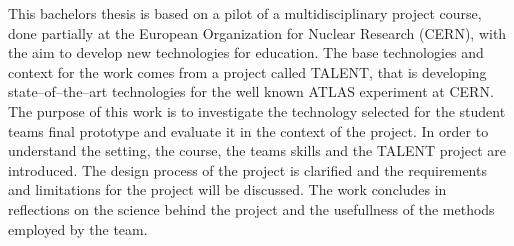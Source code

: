 \documentclass[english,12pt,a4paper,pdftex]{article}
\begin{document}

\makecoverpage

\begin{abstractpage}[english]

This bachelors thesis is based on a pilot of a multidisciplinary project course, done partially at the European Organization for Nuclear Research (CERN), with the aim to develop new technologies for education. The base technologies and context for the work comes from a project called TALENT, that is developing state--of--the--art technologies for the well known ATLAS experiment at CERN. The purpose of this work is to investigate the technology selected for the student teams final prototype and evaluate it in the context of the project. In order to understand the setting, the course, the teams skills and the TALENT project are introduced. The design process of the project is clarified and the requirements and limitations for the project will be discussed. The work concludes in reflections on the science behind the project and the usefullness of the methods employed by the team. 


\end{abstractpage}

\end{document}
